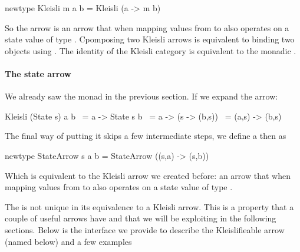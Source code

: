 \begin{haskellcode}
newtype Kleisli m a b = Kleisli (a -> m b)
\end{haskellcode}

So the arrow  is an arrow that when
mapping values from  to  also operates on a state
value of type . Cpomposing two Kleisli arrows is equivalent to
binding two  objects using \hask{>=>}. The identity of
the Kleisli category is equivalent to the monadic .

\paragraph{The state arrow}

We already saw the  monad in the previous section. If we expand
the  arrow:

\begin{haskellcode}
Kleisli (State s) a b
  ~= a -> State s b
  ~= a -> (s -> (b,s))
  ~= (a,s) -> (b,s)
\end{haskellcode}

The final way of putting it skips a few intermediate steps, we define
a  then as

\begin{haskellcode}
newtype StateArrow s a b = StateArrow ((s,a) -> (s,b))
\end{haskellcode}

Which is equivalent to the Kleisli arrow we created before: an arrow
that when mapping values from  to  also operates on a state
value of type .

The  is not unique in its equivalence to a Kleisli
arrow. This is a property that a couple of useful arrows have and that
we will be exploiting in the following sections. Below is the
interface we provide to describe the Kleislifieable arrow (named
 below) and a few examples

